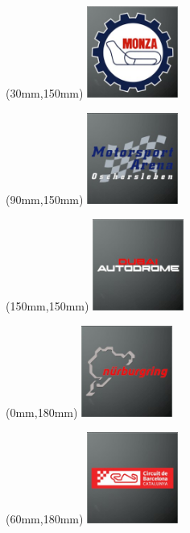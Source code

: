 \begin{textblock*}{30mm}(30mm,150mm)%
\includegraphics[width=30mm]{LG/2015-05-20_00086.png}
\end{textblock*}
\begin{textblock*}{30mm}(90mm,150mm)%
\includegraphics[width=30mm]{LG/2015-05-20_00090.png}
\end{textblock*}
\begin{textblock*}{30mm}(150mm,150mm)%
\includegraphics[width=30mm]{LG/2015-05-20_00081.png}
\end{textblock*}
\begin{textblock*}{30mm}(0mm,180mm)%
\includegraphics[width=30mm]{LG/2015-05-20_00088.png}
\end{textblock*}
\begin{textblock*}{30mm}(60mm,180mm)%
\includegraphics[width=30mm]{LG/2015-05-20_00078.png}
\end{textblock*}
